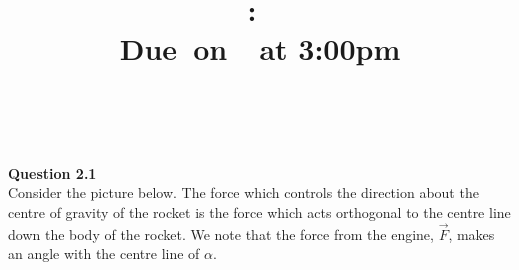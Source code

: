 \documentclass{article}
\title{
    \vspace{2in}
    \textmd{\textbf{\hmwkClass:\ \hmwkTitle}}\\
    \normalsize\vspace{0.1in}\small{Due\ on\ \hmwkDueDate\ at 3:00pm}\\
    \vspace{0.1in}\large{\textit{\hmwkClassInstructor\ \hmwkClassTime}}
    \vspace{3in}
}
\author{\textbf{\hmwkAuthorName}}
\date{}
\begin{document}
\maketitle

\pagebreak



    \textbf{Question 2.1}\\
    
     Consider the picture below. The force which controls the direction about the centre of gravity of the rocket is the force which acts orthogonal to the centre line down the body of the rocket. We note that the force from the engine, $\vec{F}$, makes an angle with the centre line of $\alpha$.
    
    
    
    \newcommand{\tikzAngleOfLine}{\tikz@AngleOfLine}
    \def\tikz@AngleOfLine(#1)(#2)#3{%
    	\pgfmathanglebetweenpoints{%
    		\pgfpointanchor{#1}{center}}{%
    		\pgfpointanchor{#2}{center}}
    	\pgfmathsetmacro{#3}{\pgfmathresult}%
    }
    
\end{document}

